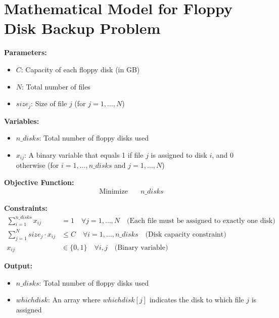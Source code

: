 \documentclass{article}
\begin{document}
\section*{Mathematical Model for Floppy Disk Backup Problem}

\textbf{Parameters:}
\begin{itemize}
    \item $C$: Capacity of each floppy disk (in GB)
    \item $N$: Total number of files
    \item $size_j$: Size of file $j$ (for $j = 1, \ldots, N$)
\end{itemize}

\textbf{Variables:}
\begin{itemize}
    \item $n\_disks$: Total number of floppy disks used
    \item $x_{ij}$: A binary variable that equals 1 if file $j$ is assigned to disk $i$, and 0 otherwise (for $i = 1, \ldots, n\_disks$ and $j = 1, \ldots, N$)
\end{itemize}

\textbf{Objective Function:}
\begin{align*}
\text{Minimize} \quad & n\_disks
\end{align*}

\textbf{Constraints:}
\begin{align*}
\sum_{i=1}^{n\_disks} x_{ij} &= 1 \quad \forall j = 1, \ldots, N \quad \text{(Each file must be assigned to exactly one disk)} \\
\sum_{j=1}^{N} size_j \cdot x_{ij} &\leq C \quad \forall i = 1, \ldots, n\_disks \quad \text{(Disk capacity constraint)} \\
x_{ij} &\in \{0, 1\} \quad \forall i, j \quad \text{(Binary variable)}
\end{align*}

\textbf{Output:}
\begin{itemize}
    \item $n\_disks$: Total number of floppy disks used
    \item $whichdisk$: An array where $whichdisk[j]$ indicates the disk to which file $j$ is assigned
\end{itemize}
\end{document}

